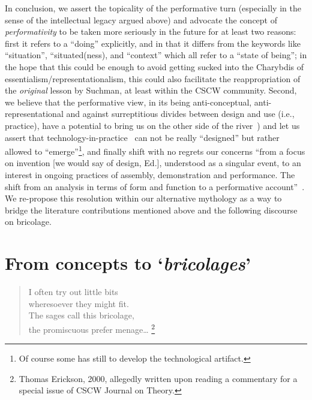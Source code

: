 \documentclass{article}
\begin{document}
In conclusion, we assert the topicality of the performative turn (especially in the sense of the intellectual legacy argued above) and advocate the concept of \emph{performativity} to be taken more seriously in the future for at least two reasons: first it refers to a ``doing'' explicitly, and in that it differs from the keywords like ``situation'', ``situated(ness), and ``context'' which all refer to a ``state of being''; in the hope that this could be enough to avoid getting sucked into the Charybdis of essentialism/representationalism, this could also facilitate the reappropriation of the \emph{original} lesson by Suchman, at least within the CSCW community. Second, we believe that the performative view, in its being anti-conceptual, anti-representational and against surreptitious divides between design and use (i.e., practice), have a potential to bring us on the other side of the river~\citep[cf. the life-raft model mentioned by ][]{buescher_landscapes_2001}) and let us assert that technology-in-practice~\citep{orlikowski_using_2000} can not be really ``designed'' but rather allowed to ``emerge''\footnote{Of course some has still to develop the technological artifact.}, and finally shift with no regrets our concerns  ``from a focus on invention [we would say of design, Ed.], understood as a singular event, to an interest in ongoing practices of assembly, demonstration and performance. The shift from an analysis in terms of form and function to a performative account''~\citep[p. 165]{suchman_working_2002}. We re-propose this resolution within our alternative mythology as a way to bridge the literature contributions mentioned above and the following discourse on bricolage.



 
















\section{From concepts to `\textit{bricolages}'}
\label{sec:bricolage}
\begin{verse}
\begin{flushright}
\scriptsize
I often try out little bits\\
wheresoever they might fit.\\
The sages call this bricolage,\\
the promiscuous prefer menage\ldots 
\footnote{Thomas Erickson, 2000, allegedly written upon reading a commentary for a special issue of CSCW Journal on Theory.}
\end{flushright}
\end{verse}
\end{document}
